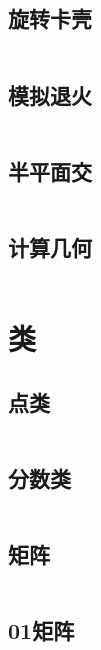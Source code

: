 \inputminted{cpp}{code/polygonCore.cc}

\subsection{旋转卡壳} 

\inputminted{cpp}{code/RotatingJam.cc}

\subsection{模拟退火} 

\inputminted{cpp}{code/SimulatedAnnealing.cc}

\subsection{半平面交} 

\inputminted{cpp}{code/half_plane_inter_section.cc}

\subsection{计算几何} 

\inputminted{cpp}{code/SJTUgeometry.cc}

\newpage\section{类} 
\subsection{点类} 

\inputminted{cpp}{code/point.cc}

\subsection{分数类} 

\inputminted{cpp}{code/Fraction.cc}

\subsection{矩阵} 

\inputminted{cpp}{code/Matrix.cc}

\subsection{01矩阵} 


